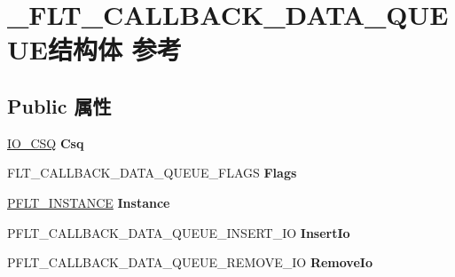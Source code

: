 \hypertarget{struct___f_l_t___c_a_l_l_b_a_c_k___d_a_t_a___q_u_e_u_e}{}\section{\+\_\+\+F\+L\+T\+\_\+\+C\+A\+L\+L\+B\+A\+C\+K\+\_\+\+D\+A\+T\+A\+\_\+\+Q\+U\+E\+U\+E结构体 参考}
\label{struct___f_l_t___c_a_l_l_b_a_c_k___d_a_t_a___q_u_e_u_e}
\subsection*{Public 属性}
\begin{DoxyCompactItemize}
\item 
\mbox{\label{struct___f_l_t___c_a_l_l_b_a_c_k___d_a_t_a___q_u_e_u_e_aade65829cd7039fe4751f6d5e0dc774a}} 
\hyperlink{struct___i_o___c_s_q}{I\+O\+\_\+\+C\+SQ} {\bfseries Csq}
\item 
\mbox{\label{struct___f_l_t___c_a_l_l_b_a_c_k___d_a_t_a___q_u_e_u_e_a0219094824034ba24688e987afd32776}} 
F\+L\+T\+\_\+\+C\+A\+L\+L\+B\+A\+C\+K\+\_\+\+D\+A\+T\+A\+\_\+\+Q\+U\+E\+U\+E\+\_\+\+F\+L\+A\+GS {\bfseries Flags}
\item 
\mbox{\label{struct___f_l_t___c_a_l_l_b_a_c_k___d_a_t_a___q_u_e_u_e_aa8a0022b126d4f762f10f3a80bd9ece3}} 
\hyperlink{struct___f_l_t___i_n_s_t_a_n_c_e}{P\+F\+L\+T\+\_\+\+I\+N\+S\+T\+A\+N\+CE} {\bfseries Instance}
\item 
\mbox{\label{struct___f_l_t___c_a_l_l_b_a_c_k___d_a_t_a___q_u_e_u_e_a17294b567c2ad5f7d4cea58f33ed2490}} 
P\+F\+L\+T\+\_\+\+C\+A\+L\+L\+B\+A\+C\+K\+\_\+\+D\+A\+T\+A\+\_\+\+Q\+U\+E\+U\+E\+\_\+\+I\+N\+S\+E\+R\+T\+\_\+\+IO {\bfseries Insert\+Io}
\item 
\mbox{\label{struct___f_l_t___c_a_l_l_b_a_c_k___d_a_t_a___q_u_e_u_e_ab45f95f09677e7dbaf6863e41c241d38}} 
P\+F\+L\+T\+\_\+\+C\+A\+L\+L\+B\+A\+C\+K\+\_\+\+D\+A\+T\+A\+\_\+\+Q\+U\+E\+U\+E\+\_\+\+R\+E\+M\+O\+V\+E\+\_\+\+IO {\bfseries Remove\+Io}

\end{DoxyCompactItemize}
